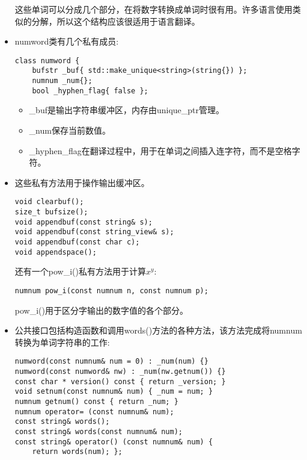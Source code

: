 \begin{itemize}
这些单词可以分成几个部分，在将数字转换成单词时很有用。许多语言使用类似的分解，所以这个结构应该很适用于语言翻译。

\item 
numword类有几个私有成员:

\begin{lstlisting}[style=styleCXX]
class numword {
	bufstr _buf{ std::make_unique<string>(string{}) };
	numnum _num{};
	bool _hyphen_flag{ false };
\end{lstlisting}

\begin{itemize}
\item 
\_buf是输出字符串缓冲区，内存由unique\_ptr管理。

\item 
\_num保存当前数值。

\item 
\_hyphen\_flag在翻译过程中，用于在单词之间插入连字符，而不是空格字符。
\end{itemize}

\item 
这些私有方法用于操作输出缓冲区。

\begin{lstlisting}[style=styleCXX]
void clearbuf();
size_t bufsize();
void appendbuf(const string& s);
void appendbuf(const string_view& s);
void appendbuf(const char c);
void appendspace();
\end{lstlisting}

还有一个pow\_i()私有方法用于计算$x^y$:

\begin{lstlisting}[style=styleCXX]
numnum pow_i(const numnum n, const numnum p);
\end{lstlisting}

pow\_i()用于区分字输出的数字值的各个部分。

\item 
公共接口包括构造函数和调用words()方法的各种方法，该方法完成将numnum转换为单词字符串的工作:

\begin{lstlisting}[style=styleCXX]
numword(const numnum& num = 0) : _num(num) {}
numword(const numword& nw) : _num(nw.getnum()) {}
const char * version() const { return _version; }
void setnum(const numnum& num) { _num = num; }
numnum getnum() const { return _num; }
numnum operator= (const numnum& num);
const string& words();
const string& words(const numnum& num);
const string& operator() (const numnum& num) {
	return words(num); };
\end{lstlisting}


\end{itemize}
